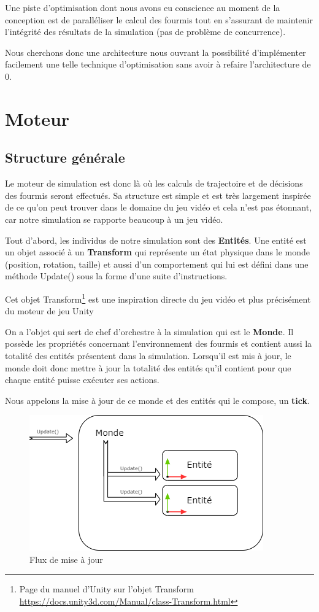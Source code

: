 \documentclass{EPUProjetDi}
\begin{document}
Une piste d'optimisation dont nous avons eu conscience au moment de la conception est de paralléliser le calcul des fourmis tout en s'assurant de maintenir
l'intégrité des résultats de la simulation (pas de problème de concurrence).

Nous cherchons donc une architecture nous ouvrant la possibilité d'implémenter facilement une telle technique d'optimisation sans avoir à
refaire l'architecture de 0. 

\pagebreak

\section{Moteur}

\subsection{Structure générale}

Le moteur de simulation est donc là où les calculs de trajectoire et de décisions des fourmis seront effectués.
Sa structure est simple et est très largement inspirée de ce qu'on peut trouver dans le domaine du jeu vidéo et 
cela n'est pas étonnant, car notre simulation se rapporte beaucoup à un jeu vidéo.

Tout d'abord, les individus de notre simulation sont des \textbf{Entités}. Une entité est un objet associé à un
\textbf{Transform} qui représente un état physique dans le monde (position, rotation, taille) et aussi d'un comportement
qui lui est défini dans une méthode Update() sous la forme d'une suite d'instructions.

Cet objet Transform\footnote{Page du manuel d'Unity sur l'objet Transform \url{https://docs.unity3d.com/Manual/class-Transform.html}} 
est une inspiration directe du jeu vidéo et plus précisément du moteur de jeu Unity

On a l'objet qui sert de chef d'orchestre à la simulation qui est le \textbf{Monde}. Il possède les propriétés concernant 
l'environnement des fourmis et contient aussi la totalité des entités présentent dans la simulation.
Lorsqu'il est mis à jour, le monde doit donc mettre à jour la totalité des entités qu'il contient pour que chaque entité 
puisse exécuter ses actions.

Nous appelons la mise à jour de ce monde et des entités qui le compose, un \textbf{tick}.

\begin{figure}[h]
    \centering
    \includegraphics[scale=0.8]{moteur_structuregenerale.png}
    \caption{Flux de mise à jour}
    \label{fig:flow_update}
\end{figure}
\end{document}
